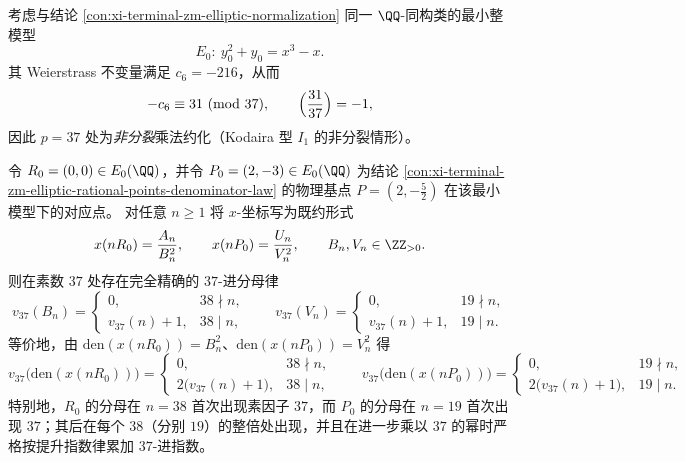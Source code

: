 
\begin{conclusion}\label{con:xi-terminal-zm-elliptic-badprime-37-nonsplit-periodicity}
考虑与结论 \ref{con:xi-terminal-zm-elliptic-normalization} 同一 \(\QQ\)-同构类的最小整模型
\[
E_0:\ y_0^{2}+y_0=x^{3}-x.
\]
其 Weierstrass 不变量满足
\(
c_6=-216
\)，从而
\[
-c_6\equiv 31\ (\mathrm{mod}\ 37),
\qquad
\Bigl(\frac{31}{37}\Bigr)=-1,
\]
因此 \(p=37\) 处为\emph{非分裂}乘法约化（Kodaira 型 \(I_1\) 的非分裂情形）。
\par
令 \(R_0=(0,0)\in E_0(\QQ)\)，并令 \(P_0=(2,-3)\in E_0(\QQ)\) 为结论 \ref{con:xi-terminal-zm-elliptic-rational-points-denominator-law} 的物理基点 \(P=(2,-\tfrac52)\) 在该最小模型下的对应点。
对任意 \(n\ge 1\) 将 \(x\)-坐标写为既约形式
\[
x(nR_0)=\frac{A_n}{B_n^{2}},
\qquad
x(nP_0)=\frac{U_n}{V_n^{2}},
\qquad
B_n,V_n\in\ZZ_{>0}.
\]
则在素数 \(37\) 处存在完全精确的 \(37\)-进分母律
\[
v_{37}(B_n)=
\begin{cases}
0,& 38\nmid n,\\
v_{37}(n)+1,& 38\mid n,
\end{cases}
\qquad
v_{37}(V_n)=
\begin{cases}
0,& 19\nmid n,\\
v_{37}(n)+1,& 19\mid n.
\end{cases}
\]
等价地，由 \(\mathrm{den}(x(nR_0))=B_n^2\)、\(\mathrm{den}(x(nP_0))=V_n^2\) 得
\[
v_{37}\!\bigl(\mathrm{den}(x(nR_0))\bigr)=
\begin{cases}
0,& 38\nmid n,\\
2\bigl(v_{37}(n)+1\bigr),& 38\mid n,
\end{cases}
\qquad
v_{37}\!\bigl(\mathrm{den}(x(nP_0))\bigr)=
\begin{cases}
0,& 19\nmid n,\\
2\bigl(v_{37}(n)+1\bigr),& 19\mid n.
\end{cases}
\]
特别地，\(R_0\) 的分母在 \(n=38\) 首次出现素因子 \(37\)，而 \(P_0\) 的分母在 \(n=19\) 首次出现 \(37\)；其后在每个 \(38\)（分别 \(19\)）的整倍处出现，并且在进一步乘以 \(37\) 的幂时严格按提升指数律累加 \(37\)-进指数。
\end{conclusion}
